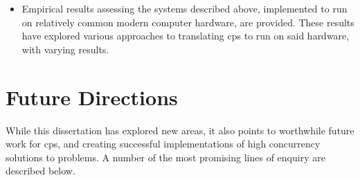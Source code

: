 \begin{itemize}
    \item Empirical results assessing the systems described above, implemented to run on relatively common modern computer hardware, are provided.  These results have explored various approaches to translating \gls{cps} to run on said hardware, with varying results.
\end{itemize}

\section{Future Directions}

While this dissertation has explored new areas, it also points to worthwhile future work for \gls{cps}, and creating successful implementations of high concurrency solutions to problems.  A number of the most promising lines of enquiry are described below.





